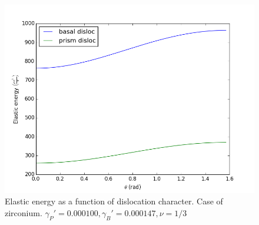 \documentclass[10pt,a4paper,final]{article}
\begin{document}
\begin{figure}[htbp]
\centering
\includegraphics[scale=0.7]{png/zr_basal_prism}
\caption{Elastic energy as a function of dislocation character. Case of zirconium. $\gamma_P' = 0.000100, \gamma_B' = 0.000147, \nu=1/3$}
\label{fig:zr}
\end{figure}

\pagebreak


\end{document}
